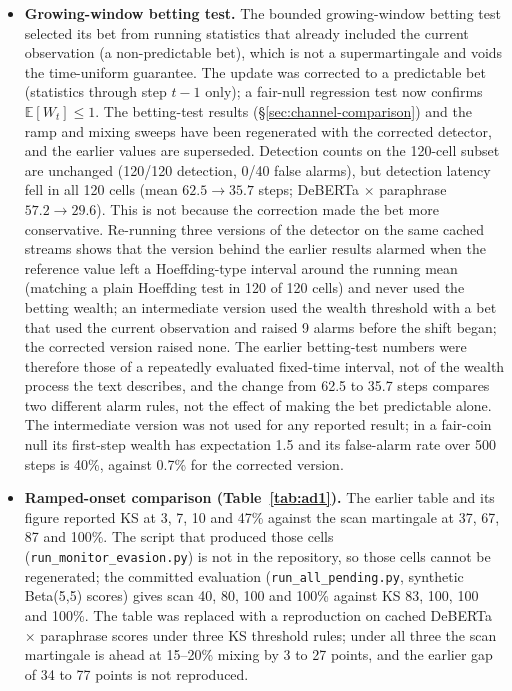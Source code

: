 \documentclass{article}
\begin{document}
\begin{itemize}
\item \textbf{Growing-window betting test.} The bounded growing-window betting test selected its bet from running statistics that already included the current observation (a non-predictable bet), which is not a supermartingale and voids the time-uniform guarantee. The update was corrected to a predictable bet (statistics through step $t-1$ only); a fair-null regression test now confirms $\mathbb{E}[W_t]\leq 1$. The betting-test results (\S\ref{sec:channel-comparison}) and the ramp and mixing sweeps have been regenerated with the corrected detector, and the earlier values are superseded. Detection counts on the 120-cell subset are unchanged (120/120 detection, 0/40 false alarms), but detection latency fell in all 120 cells (mean $62.5 \to 35.7$ steps; DeBERTa $\times$ paraphrase $57.2 \to 29.6$). This is not because the correction made the bet more conservative. Re-running three versions of the detector on the same cached streams shows that the version behind the earlier results alarmed when the reference value left a Hoeffding-type interval around the running mean (matching a plain Hoeffding test in 120 of 120 cells) and never used the betting wealth; an intermediate version used the wealth threshold with a bet that used the current observation and raised 9 alarms before the shift began; the corrected version raised none. The earlier betting-test numbers were therefore those of a repeatedly evaluated fixed-time interval, not of the wealth process the text describes, and the change from 62.5 to 35.7 steps compares two different alarm rules, not the effect of making the bet predictable alone. The intermediate version was not used for any reported result; in a fair-coin null its first-step wealth has expectation 1.5 and its false-alarm rate over 500 steps is 40\%, against 0.7\% for the corrected version.
\item \textbf{Ramped-onset comparison (Table~\ref{tab:ad1}).} The earlier table and its figure reported KS at 3, 7, 10 and 47\% against the scan martingale at 37, 67, 87 and 100\%. The script that produced those cells (\texttt{run\_monitor\_evasion.py}) is not in the repository, so those cells cannot be regenerated; the committed evaluation (\texttt{run\_all\_pending.py}, synthetic Beta(5,5) scores) gives scan 40, 80, 100 and 100\% against KS 83, 100, 100 and 100\%. The table was replaced with a reproduction on cached DeBERTa $\times$ paraphrase scores under three KS threshold rules; under all three the scan martingale is ahead at 15--20\% mixing by 3 to 27 points, and the earlier gap of 34 to 77 points is not reproduced.

\end{itemize}
\end{document}
